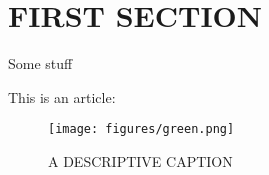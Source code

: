 \section{FIRST SECTION}

Some stuff

This is an article: \cite{ZimmeckNDSS}

\begin{figure}
	\texttt{[image: figures/green.png]}
	\caption{A DESCRIPTIVE CAPTION}
	\label{fig:green}
\end{figure}
